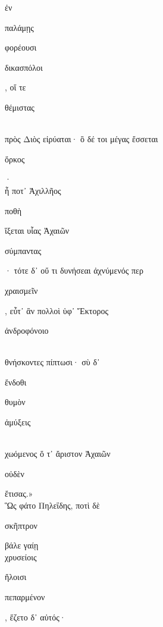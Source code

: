 \documentclass{ransom}
\begin{document}
\begin{foreignpage}
\begin{graytext}
ἐν \begin{whitetext}παλάμῃς\end{whitetext} φορέουσι \begin{whitetext}δικασπόλοι\end{whitetext}, οἵ τε \begin{whitetext}θέμιστας\end{whitetext}\\
πρὸς Διὸς εἰρύαται· ὃ δέ τοι μέγας ἔσσεται \begin{whitetext}ὅρκος\end{whitetext}·\\
ἦ ποτ᾽ Ἀχιλλῆος \begin{whitetext}ποθὴ\end{whitetext} ἵξεται υἷας Ἀχαιῶν\hfill{}\\
\begin{whitetext}σύμπαντας\end{whitetext}· τότε δ᾽ οὔ τι δυνήσεαι ἀχνύμενός περ\\
\begin{whitetext}χραισμεῖν\end{whitetext}, εὖτ᾽ ἂν πολλοὶ ὑφ᾽ Ἕκτορος \begin{whitetext}ἀνδροφόνοιο\end{whitetext}\\
θνήσκοντες πίπτωσι· σὺ δ᾽ \begin{whitetext}ἔνδοθι\end{whitetext} θυμὸν \begin{whitetext}ἀμύξεις\end{whitetext}\\
χωόμενος ὅ τ᾽ ἄριστον Ἀχαιῶν \begin{whitetext}οὐδὲν\end{whitetext} ἔτισας.»\\
Ὣς φάτο Πηλεΐδης, ποτὶ δὲ \begin{whitetext}σκῆπτρον\end{whitetext} βάλε γαίῃ\hfill{}\\
χρυσείοις \begin{whitetext}ἥλοισι\end{whitetext} \begin{whitetext}πεπαρμένον\end{whitetext}, ἕζετο δ᾽ αὐτός·\\

\end{graytext}


\end{foreignpage}
\end{document}
